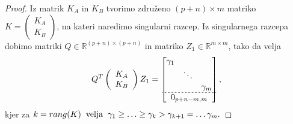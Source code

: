 \documentclass[mat1]{article}
\begin{document}
\begin{proof}

Iz matrik $K_A$ in $K_B$ tvorimo združeno $(p+n)\times m$ matriko $K = \left(\begin{array}{c} K_A \\ K_B \end{array}\right)$, na kateri naredimo singularni razcep. Iz singularnega razcepa dobimo matriki $Q \in \mathbb{R}^{(p+n) \times (p+n)}$ in matriko $Z_1 \in \mathbb{R}^{m \times m}$, tako da velja 
\begin{equation}
Q^T \left(\begin{array}{c} K_A \\ K_B \end{array}\right) Z_1 = 
\begin{bmatrix}
\begin{matrix}
\gamma_1 & & \\
 & \ddots & \\
 & & \gamma_m
\end{matrix} \\ \hdashline[2pt/2pt]
0_{p+n-m, m}
\end{bmatrix} 
\text{,}
\label{eq:1}
\end{equation}
kjer za
$
k = rang(K) \hspace{2mm} \text{velja} \hspace{2mm} 
\gamma_1 \geq \ldots \geq \gamma_k > \gamma_{k+1} = \ldots \gamma_m \text{.} $


\end{proof}
\end{document}
